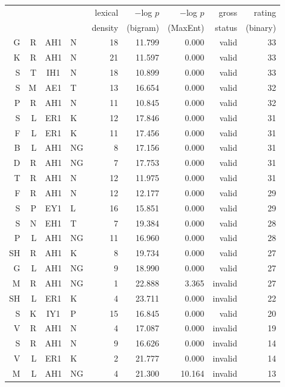 \begin{longtable}{r@{ }r@{ }c@{ }l@{ } rrrrr}
\toprule
  &   &    &     & lexical & $-$log $p$ & $-$log $p$ & gross  & rating   \\
  &   &    &     & density & (bigram)   & (MaxEnt)   & status & (binary) \\
\midrule 
 G &  R & AH1 & N  & 18 & 11.799 &  0.000 &   valid & 33 \\
 K &  R & AH1 & N  & 21 & 11.597 &  0.000 &   valid & 33 \\
 S &  T & IH1 & N  & 18 & 10.899 &  0.000 &   valid & 33 \\
 S &  M & AE1 & T  & 13 & 16.654 &  0.000 &   valid & 32 \\
 P &  R & AH1 & N  & 11 & 10.845 &  0.000 &   valid & 32 \\
 S &  L & ER1 & K  & 12 & 17.846 &  0.000 &   valid & 31 \\
 F &  L & ER1 & K  & 11 & 17.456 &  0.000 &   valid & 31 \\
 B &  L & AH1 & NG &  8 & 17.156 &  0.000 &   valid & 31 \\
 D &  R & AH1 & NG &  7 & 17.753 &  0.000 &   valid & 31 \\
 T &  R & AH1 & N  & 12 & 11.975 &  0.000 &   valid & 31 \\
 F &  R & AH1 & N  & 12 & 12.177 &  0.000 &   valid & 29 \\
 S &  P & EY1 & L  & 16 & 15.851 &  0.000 &   valid & 29 \\
 S &  N & EH1 & T  &  7 & 19.384 &  0.000 &   valid & 28 \\
 P &  L & AH1 & NG & 11 & 16.960 &  0.000 &   valid & 28 \\
SH &  R & AH1 & K  &  8 & 19.734 &  0.000 &   valid & 27 \\
 G &  L & AH1 & NG &  9 & 18.990 &  0.000 &   valid & 27 \\
 M &  R & AH1 & NG &  1 & 22.888 &  3.365 & invalid & 27 \\
SH &  L & ER1 & K  &  4 & 23.711 &  0.000 & invalid & 22 \\
 S &  K & IY1 & P  & 15 & 16.845 &  0.000 &   valid & 20 \\
 V &  R & AH1 & N  &  4 & 17.087 &  0.000 & invalid & 19 \\
 S &  R & AH1 & N  &  9 & 16.626 &  0.000 & invalid & 14 \\
 V &  L & ER1 & K  &  2 & 21.777 &  0.000 & invalid & 14 \\
 M &  L & AH1 & NG &  4 & 21.300 & 10.164 & invalid & 13 \\

\end{longtable}
